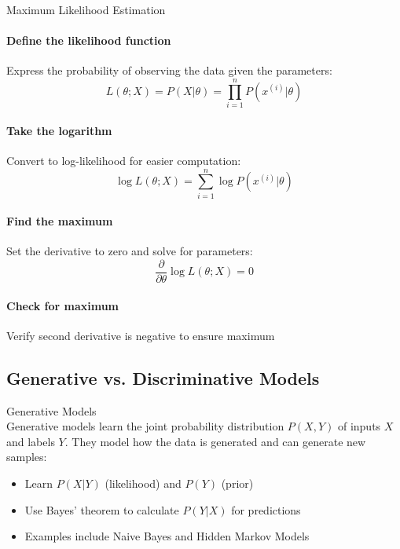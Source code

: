 \begin{KR}{Maximum Likelihood Estimation}
\paragraph{Define the likelihood function}
Express the probability of observing the data given the parameters:
\[L(\theta; X) = P(X|\theta) = \prod_{i=1}^{n} P(x^{(i)}|\theta)\]

\paragraph{Take the logarithm}
Convert to log-likelihood for easier computation:
\[\log L(\theta; X) = \sum_{i=1}^{n} \log P(x^{(i)}|\theta)\]

\paragraph{Find the maximum}
Set the derivative to zero and solve for parameters:
\[\frac{\partial}{\partial \theta} \log L(\theta; X) = 0\]

\paragraph{Check for maximum}
Verify second derivative is negative to ensure maximum
\end{KR}



\multend

\subsection{Generative vs. Discriminative Models}

\begin{definition}{Generative Models}\\
Generative models learn the joint probability distribution $P(X, Y)$ of inputs $X$ and labels $Y$. They model how the data is generated and can generate new samples:
\begin{itemize}
    \item Learn $P(X|Y)$ (likelihood) and $P(Y)$ (prior)
    \item Use Bayes' theorem to calculate $P(Y|X)$ for predictions
    \item Examples include Naive Bayes and Hidden Markov Models
\end{itemize}
\end{definition}

